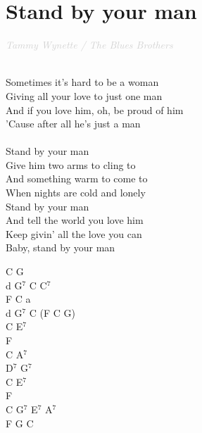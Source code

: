 \documentclass[a5paper, 10pt]{book}
\begin{document}
\section{Stand by your man}\textcolor{lightgray}{\textit{Tammy Wynette / The Blues Brothers}}\\~\\
\begin{minipage}[t]{0.7\textwidth}
  Sometimes it's hard to be a woman\\
  Giving all your love to just one man\\
  And if you love him, oh, be proud of him\\
  'Cause after all he's just a man\\
  \\
  \hspace*{5mm}Stand by your man\\
  \hspace*{5mm}Give him two arms to cling to\\
  \hspace*{5mm}And something warm to come to\\
  \hspace*{5mm}When nights are cold and lonely\\
  \hspace*{5mm}Stand by your man\\
  \hspace*{5mm}And tell the world you love him\\
  \hspace*{5mm}Keep givin' all the love you can\\
  \hspace*{5mm}Baby, stand by your man\\
\end{minipage}
\begin{minipage}[t]{0.3\textwidth}
  C G\\
  d G$^7$ C C$^7$\\
  F C a\\
  d G$^7$ C (F C G)\\

  C E$^7$\\
  F\\
  C A$^7$\\
  D$^7$ G$^7$\\
  C E$^7$\\
  F\\
  C G$^7$ E$^7$ A$^7$\\
  F G C\\
\end{minipage}
\end{document}
